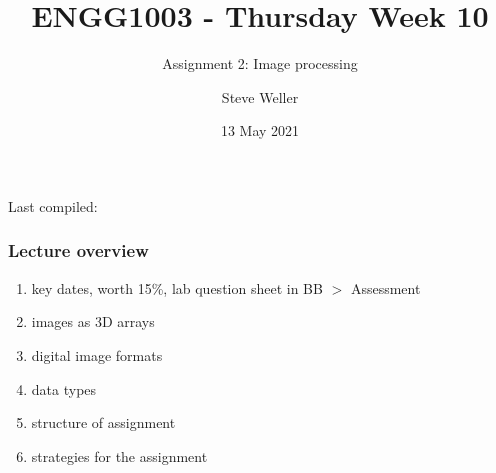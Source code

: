 \documentclass[english,14pt]{beamer}
\title{ENGG1003 - Thursday Week 10}
\subtitle{Assignment 2: Image processing}
\author{Steve Weller}
\institute{University of Newcastle}
\date{13 May 2021}
\begin{document}
\begin{flushleft}
{\scriptsize Last compiled:~\DTMnow}
\vspace*{-5mm}
\end{flushleft}
\framebreak


\begin{frame}[fragile]

\frametitle{Lecture overview}
\begin{enumerate}
	\item key dates, worth 15\%, lab question sheet in BB $>$ Assessment

	\item images as 3D arrays
	
	\item digital image formats

	\item data types
		
	\item structure of assignment

	\item strategies for the assignment
	
\end{enumerate}

\end{frame}
\end{document}
